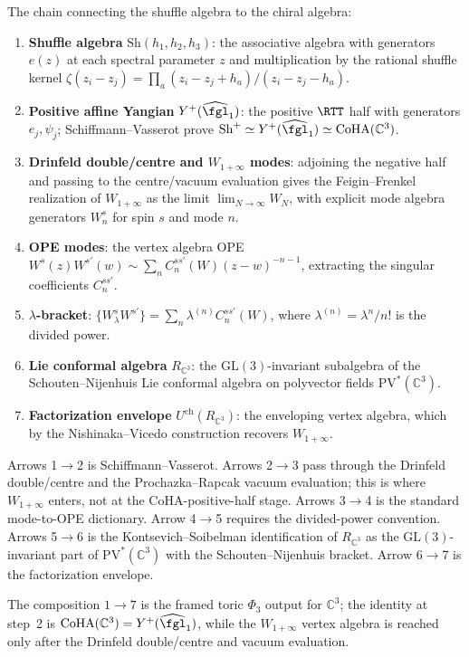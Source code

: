 \begin{construction}
\label{constr:seven-arrow-chain}
The chain connecting the shuffle algebra to the chiral algebra:
\begin{enumerate}
 \item \textbf{Shuffle algebra} $\mathrm{Sh}(h_1, h_2, h_3)$: the associative algebra with generators $e(z)$ at each spectral parameter $z$ and multiplication by the rational shuffle kernel $\zeta(z_i - z_j) = \prod_a (z_i - z_j + h_a)/(z_i - z_j - h_a)$.
 \item \textbf{Positive affine Yangian} $Y^+(\widehat{\fgl}_1)$: the positive $\RTT$ half with generators $e_j,\psi_j$; Schiffmann--Vasserot prove $\mathrm{Sh}^+ \simeq Y^+(\widehat{\fgl}_1) \simeq \mathrm{CoHA}(\mathbb{C}^3)$.
 \item \textbf{Drinfeld double/centre and $W_{1+\infty}$ modes}: adjoining the negative half and passing to the centre/vacuum evaluation gives the Feigin--Frenkel realization of $W_{1+\infty}$ as the limit $\lim_{N \to \infty} W_N$, with explicit mode algebra generators $W^s_n$ for spin $s$ and mode $n$.
 \item \textbf{OPE modes}: the vertex algebra OPE $W^s(z) W^{s'}(w) \sim \sum_n C^{ss'}_n(W)(z-w)^{-n-1}$, extracting the singular coefficients $C^{ss'}_n$.
 \item \textbf{$\lambda$-bracket}: $\{W^s_\lambda W^{s'}\} = \sum_n \lambda^{(n)} C^{ss'}_n(W)$, where $\lambda^{(n)} = \lambda^n / n!$ is the divided power.
 \item \textbf{Lie conformal algebra} $R_{\mathbb{C}^3}$: the $\mathrm{GL}(3)$-invariant subalgebra of the Schouten--Nijenhuis Lie conformal algebra on polyvector fields $\mathrm{PV}^*(\mathbb{C}^3)$.
 \item \textbf{Factorization envelope} $U^{\mathrm{ch}}(R_{\mathbb{C}^3})$: the enveloping vertex algebra, which by the Nishinaka--Vicedo construction recovers $W_{1+\infty}$.
\end{enumerate}
Arrows 1$\to$2 is Schiffmann--Vasserot. Arrows 2$\to$3 pass through the Drinfeld double/centre and the Prochazka--Rapcak vacuum evaluation; this is where $W_{1+\infty}$ enters, not at the CoHA-positive-half stage. Arrows 3$\to$4 is the standard mode-to-OPE dictionary. Arrow 4$\to$5 requires the divided-power convention. Arrows 5$\to$6 is the Kontsevich--Soibelman identification of $R_{\mathbb{C}^3}$ as the $\mathrm{GL}(3)$-invariant part of $\mathrm{PV}^*(\mathbb{C}^3)$ with the Schouten--Nijenhuis bracket. Arrow 6$\to$7 is the factorization envelope.

The composition $1 \to 7$ is the framed toric $\Phi_3$ output for
$\mathbb{C}^3$; the identity at step~2 is
$\mathrm{CoHA}(\mathbb{C}^3)=Y^+(\widehat{\fgl}_1)$, while the
$W_{1+\infty}$ vertex algebra is reached only after the Drinfeld
double/centre and vacuum evaluation.
\end{construction}

